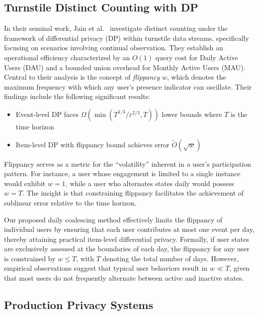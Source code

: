 \documentclass[sigconf,anonymous,review]{acmart}
\begin{document}
\subsection{Turnstile Distinct Counting with DP}

In their seminal work, Jain et al.~\cite{Flippancy2023} investigate distinct counting under the framework of differential privacy (DP) within turnstile data streams, specifically focusing on scenarios involving continual observation. They establish an operational efficiency characterized by an $O(1)$ query cost for Daily Active Users (DAU) and a bounded union overhead for Monthly Active Users (MAU). Central to their analysis is the concept of \emph{flippancy} $w$, which denotes the maximum frequency with which any user's presence indicator can oscillate. Their findings include the following significant results:

\begin{itemize}
    \item Event-level DP faces $\Omega(\min(T^{1/3}/\varepsilon^{2/3}, T))$ lower bounds where $T$ is the time horizon
    \item Item-level DP with flippancy bound achieves error $\tilde{O}(\sqrt{w})$
\end{itemize}

Flippancy serves as a metric for the ``volatility'' inherent in a user's participation pattern. For instance, a user whose engagement is limited to a single instance would exhibit $w = 1$, while a user who alternates states daily would possess $w = T$. The insight is that constraining flippancy facilitates the achievement of sublinear error relative to the time horizon.

Our proposed daily coalescing method effectively limits the flippancy of individual users by ensuring that each user contributes at most one event per day, thereby attaining practical item-level differential privacy. Formally, if user states are exclusively assessed at the boundaries of each day, the flippancy for any user is constrained by $w \leq T$, with $T$ denoting the total number of days. However, empirical observations suggest that typical user behaviors result in $w \ll T$, given that most users do not frequently alternate between active and inactive states.

\subsection{Production Privacy Systems}
\end{document}

